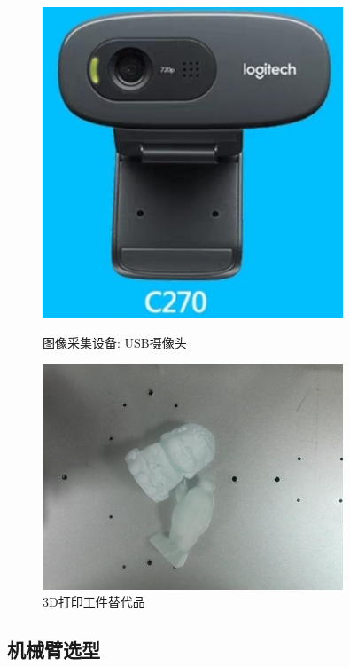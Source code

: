 \begin{figure}[h]
    \begin{minipage}[t]{0.45\textwidth}
        \centering
        \includegraphics[width=0.8\textwidth]{pic/chap2/USB_camera.jpg}
        \caption{图像采集设备: USB摄像头}
        \label{fig:USB_camera}
    \end{minipage}
    \begin{minipage}[t]{0.45\textwidth}
        \centering
        \includegraphics[width=0.8\textwidth]{pic/chap2/printer.jpg}
        \caption{3D打印工件替代品}
        \label{fig:printer}
    \end{minipage}
\end{figure}

\subsection{机械臂选型}

